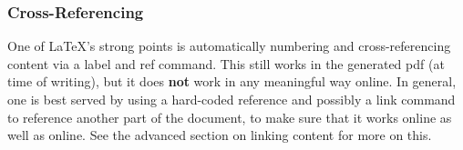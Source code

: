 \documentclass{ximera}
\begin{document}
        \subsubsection*{Cross-Referencing}
            One of LaTeX's strong points is automatically numbering and cross-referencing content via a label and ref command. This still works in the generated pdf (at time of writing), but it does \textbf{not} work in any meaningful way online. In general, one is best served by using a hard-coded reference and possibly a link command to reference another part of the document, to make sure that it works online as well as online. See the advanced section on linking content for more on this. 
        
        
\end{document}
